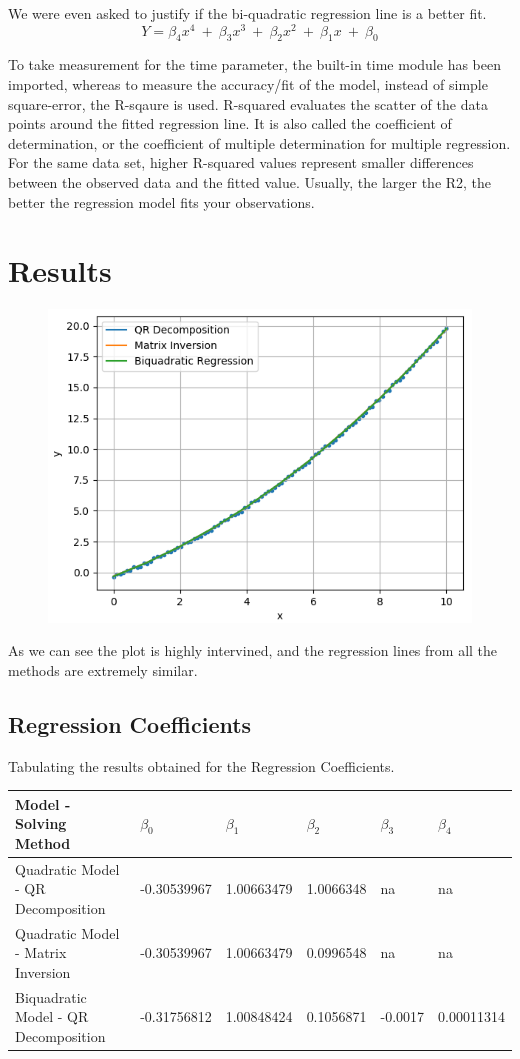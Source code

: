 \documentclass[11pt]{article}
\begin{document}
We were even asked to justify if the bi-quadratic regression line is a better fit.
\[Y = \beta_4 x^4 ~+~ \beta_3 x^3 ~+~\beta_2 x^2 ~+~ \beta_1 x ~+~ \beta_0\]

To take measurement for the time parameter, the built-in time module has been imported, whereas to measure the accuracy/fit of the model, instead of simple square-error, the R-sqaure is used. R-squared evaluates the scatter of the data points around the fitted regression line. It is also called the coefficient of determination, or the coefficient of multiple determination for multiple regression. For the same data set, higher R-squared values represent smaller differences between the observed data and the fitted value. Usually, the larger the R2, the better the regression model fits your observations. 

\section{Results}
\begin{figure}[h!]
	\centering
	\centering
	\includegraphics[width=0.7\linewidth]{Task5}
	\label{Plot}
\end{figure}

As we can see the plot is highly intervined, and the regression lines from all the methods are extremely similar.

\subsection{Regression Coefficients}
Tabulating the results obtained for the Regression Coefficients.
\begin{table} [h!]
	\centering
	\begin{tabular}{| l | l | l | l | l | l |}
		\hline
		Model - Solving Method & $\beta_0$ & $\beta_1$ & $\beta_2$  & $\beta_3$ & $\beta_4$\\
		\hline \hline
		Quadratic Model - QR Decomposition & -0.30539967 & 1.00663479 & 1.0066348  & na & na \\
		\hline 
		Quadratic Model - Matrix Inversion & -0.30539967 & 1.00663479  & 0.0996548  & na & na \\
		\hline 
		Biquadratic Model - QR Decomposition & -0.31756812 & 1.00848424  & 0.1056871  & -0.0017 & 0.00011314\\
		\hline
	\end{tabular}
\end{table}
\end{document}
